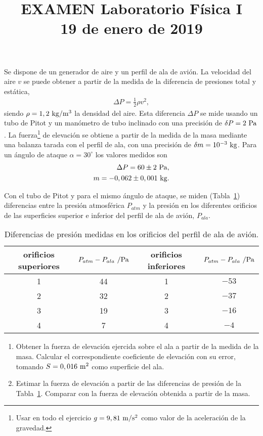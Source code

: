 \documentclass[12pt]{articulo}
\date{\vspace{-5ex}}
\begin{document}
\title{\bf EXAMEN Laboratorio F\'isica I\\19 de enero de 2019} 

\author{}

\maketitle

Se dispone de un generador de aire y un perfil de ala de avi\'on. La velocidad
del aire $v$ se puede obtener a partir de la medida de la diferencia de
presiones total y est\'atica,
%
\begin{eqnarray*}
\Delta P = \frac{1}{2}\rho v^2,
\end{eqnarray*}
%
siendo $\rho = 1,2~{\rm kg/m^3}$ la densidad del aire. Esta diferencia $\Delta P$
se mide usando un tubo de Pitot y un man\'ometro de tubo inclinado con una
precisi\'on de $\delta P = 2~{\rm Pa}$. La fuerza\footnote{Usar en todo el
ejercicio $g = 9,81~{\rm m/s^2}$ como valor de la aceleraci\'on de la gravedad.}
de elevaci\'on se obtiene a partir de la medida de la masa mediante una balanza
tarada con el perfil de ala, con una precisi\'on de $\delta m = 10^{-3}~{\rm kg}$.
Para un \'angulo de ataque $\alpha = 30^{\circ}$ los valores medidos son
%
\begin{eqnarray*}
\Delta P = 60 \pm 2~{\rm Pa},\\
m = -0,062 \pm 0,001~{\rm kg}.
\end{eqnarray*}

Con el tubo de Pitot y para el mismo \'angulo de ataque, se miden
(Tabla~\ref{tab:presiones}) diferencias entre la presi\'on atmosf\'erica
$P_{atm}$ y la presi\'on en los diferentes orificios de las superficies superior
e inferior del perfil de ala de avi\'on, $P_{ala}$.
\begin{table}[h!]
\begin{center}
\begin{tabular}{cc|cc}
\hline
orificios superiores & $P_{atm} - P_{ala}~/{\rm Pa}$ & orificios inferiores & $P_{atm} - P_{ala}~/{\rm Pa}$\\
\hline
1 & 44 & 1 & $-53$\\
2 & 32 & 2 & $-37$\\
3 & 19 & 3 & $-16$\\
4 &  7 & 4 &  $-4$\\
\hline
\end{tabular}
\end{center}
\caption{Diferencias de presi\'on medidas en los orificios del perfil de ala de avi\'on.}
\label{tab:presiones}
\end{table}

\begin{enumerate}
\item{Obtener la fuerza de elevaci\'on ejercida sobre el ala a partir de la
medida de la masa. Calcular el correspondiente coeficiente de elevaci\'on con su
error, tomando $S = 0,016~{\rm m^2}$ como superficie del ala.}
\item{Estimar la fuerza de elevaci\'on a partir de las diferencias de presi\'on
de la Tabla~\ref{tab:presiones}. Comparar con la fuerza de elevaci\'on obtenida
a partir de la masa.}
\end{enumerate}
\end{document}
